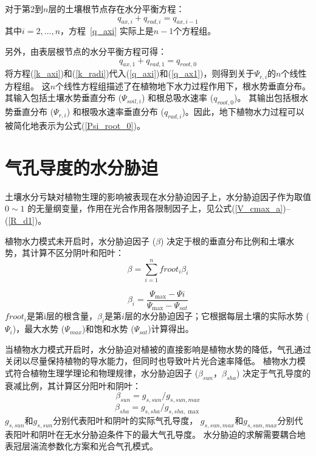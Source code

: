对于第2到$n$层的土壤根节点存在水分平衡方程：
\begin{equation}\label{q_axi}
q_{a x, i}+q_{r a d, i}=q_{a x, i-1}
\end{equation}
其中$i=2, \ldots, n$，方程~\eqref{q_axi} 实际上是$n-1$个方程组。


另外，由表层根节点的水分平衡方程可得：
\begin{equation}\label{q_ax1}
q_{ax,1}+q_{rad, 1}=q_{root,0}
\end{equation}
将方程(\ref{k_axi})和(\ref{k_radi})代入(\ref{q_axi})和(\ref{q_ax1})，则得到关于$ \Psi_{r,i}$的$n$个线性方程组。
这$n$个线性方程组描述了在植物地下水力过程作用下，根水势垂直分布。其输入包括土壤水势垂直分布 ($\Psi_{soil,i}$) 和根总吸水速率 ($q_{root,0}$)。
其输出包括根水势垂直分布 ($\Psi_{r,i}$) 和根吸水速率垂直分布 ($q_{rad,i}$)。因此，地下植物水力过程可以被简化地表示为公式(\ref{Psi_root_0})。


\section{气孔导度的水分胁迫}\label{气孔导度的水分胁迫}
土壤水分亏缺对植物生理的影响被表现在水分胁迫因子上，水分胁迫因子作为取值 $0\sim 1$ 的无量纲变量，作用在光合作用各限制因子上，见公式(\ref{V_cmax_a})--(\ref{R_d1})。

植物水力模式未开启时，水分胁迫因子 ($\beta$) 决定于根的垂直分布比例和土壤水势，其计算不区分阴叶和阳叶：
\begin{equation}\label{beta_0}
\beta=\sum_{i=1}^{n} froot_i \beta_{i}
\end{equation}

\begin{equation}\label{beta_i}
\beta_{i}=\frac{\Psi_{\max }-\Psi i}{\Psi_{\max }-\Psi_{s a t}}
\end{equation}
$froot_i$是第i层的根含量，$\beta_i$是第$i$层的水分胁迫因子；它根据每层土壤的实际水势 (${\Psi}_i$)，最大水势 (${\Psi}_{max}$)和饱和水势 (${\Psi}_{sat}$)计算得出。

当植物水力模式开启时，水分胁迫对植被的直接影响是植物水势的降低，气孔通过关闭以尽量保持植物的导水能力，但同时也导致叶片光合速率降低。
植物水力模式符合植物生理学理论和物理规律，水分胁迫因子 ($\beta_{sun}$，$\beta_{sha}$) 决定于气孔导度的衰减比例，其计算区分阳叶和阴叶：
\begin{equation}\label{beta_sun}
\beta_{sun}=g_{s,sun} / g_{s,sun,max }
\end{equation}
\begin{equation}\label{beta_sha}
\beta_{sha}=g_{s,sha} / g_{s,sha, \max }
\end{equation}
$g_{s,sun}$和$g_{s,sun}$分别代表阳叶和阴叶的实际气孔导度，
$g_{s,sun,max}$和$g_{s,sun,max}$分别代表阳叶和阴叶在无水分胁迫条件下的最大气孔导度。
水分胁迫的求解需要耦合地表冠层湍流参数化方案和光合气孔模式。



